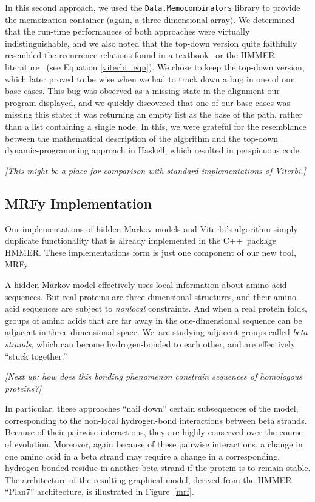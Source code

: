 \documentclass[preprint,nonatbib,blockstyle,nocopyrightspace,times]{sigplanconf}
\let\cite\citep
\begin{document}
In this second approach, we used the 
\texttt{Data.Memocombinators} library to provide the memoization container 
(again, a three-dimensional array).
We determined that the run-time 
performances of both approaches were virtually indistinguishable, and we also 
noted that the top-down version quite faithfully resembled the recurrence 
relations found in a textbook~\cite{Durbin:1998wz} or the HMMER literature~\cite{Eddy:1998ut} 
(see Equation \ref{viterbi_eqn}).
We chose to keep the top-down version, which 
later proved to be wise when we had to track down a bug in one of our base 
cases.
This bug was observed as a missing state in the alignment our program 
displayed, and we quickly discovered that one of our base cases was missing 
this state: it was returning an empty list as the base of the path, rather than 
a list containing a single node.
In this, we were grateful for the resemblance 
between the mathematical description of the algorithm and the top-down 
dynamic-programming approach in Haskell, which resulted in perspicuous code.



\emph{[This might be a place for comparison with standard
implementations of Viterbi.]}



\subsection{MRFy Implementation}

Our implementations of hidden Markov models and Viterbi's algorithm
simply duplicate 
functionality that is already implemented in the C++~package
HMMER.
These implementations form is just one component of our new tool, MRFy.

A hidden Markov model effectively uses local information about
amino-acid sequences.
But real proteins are three-dimensional structures,
and their amino-acid sequences are subject to \emph{nonlocal}
constraints. 
And when a real protein folds, groups of amino acids
that are far away in the one-dimensional sequence can be
adjacent in three-dimensional space.
We~are studying adjacent groups called \emph{beta strands}, which
can become hydrogen-bonded to each other,
and are effectively ``stuck together.''



\emph{[Next up: how does this bonding phenomenon constrain sequences
of homologous proteins?]}



In particular, these approaches ``nail down'' 
certain subsequences of the model, corresponding to the non-local hydrogen-bond 
interactions between beta strands.
Because of their pairwise 
interactions, they are highly conserved over the course of evolution.
Moreover, 
again because of these pairwise interactions, a change in one amino acid in a 
beta strand may require a change in a corresponding, hydrogen-bonded residue in 
another beta strand if the protein is to remain stable.
The architecture of the 
resulting graphical model, derived from the HMMER ``Plan7'' architecture, is 
illustrated in Figure~\ref{mrf}.
\end{document}
